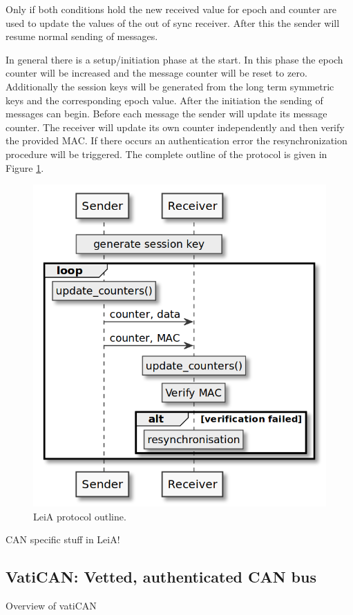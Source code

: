 Only if both conditions hold the new received value for epoch and counter are used to update the values of the out of sync receiver. After this the sender will resume normal sending of messages. 

In general there is a setup/initiation phase at the start. In this phase the epoch counter will be increased and the message counter will be reset to zero. Additionally the session keys will be generated from the long term symmetric keys and the corresponding epoch value. After the initiation the sending of messages can begin. Before each message the sender will update its message counter. The receiver will update its own counter independently and then verify the provided MAC. If there occurs an authentication error the resynchronization procedure will be triggered. The complete outline of the protocol is given in Figure \ref{fig:leia_outline}.

\begin{figure}[h]
    \centering
    \captionsetup{justification=centering}
	\includegraphics[width=0.9\linewidth]{Figures/LeiA_outline.png}
	\caption[]{LeiA protocol outline.}
	\label{fig:leia_outline}
\end{figure}

CAN specific stuff in LeiA!

\subsection{VatiCAN: Vetted, authenticated CAN bus}
\label{subsec:vatican}

Overview of vatiCAN \cite{Nurnberger2016}
